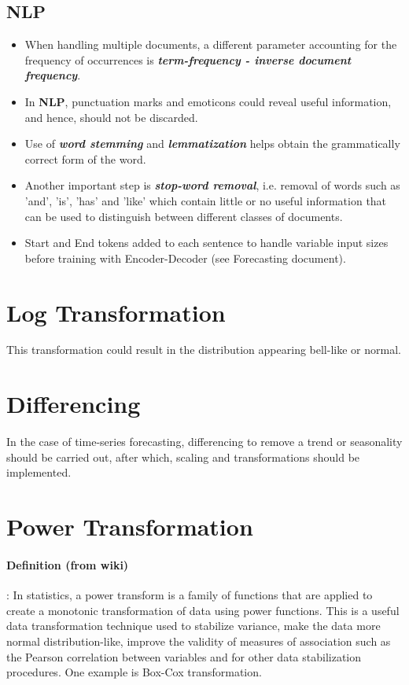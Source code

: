 \documentclass[a4paper, 12pt]{report}
\begin{document}
\subsection{NLP}
\begin{itemize}

\item When handling multiple documents, a different parameter accounting for the frequency of occurrences is \textbf{\textit{term-frequency - inverse document frequency}}.

\item In \textbf{NLP}, punctuation marks and emoticons could reveal useful information, and hence, should not be discarded.

\item Use of \textbf{\textit{word stemming}} and \textbf{\textit{lemmatization}} helps obtain the grammatically correct form of the word.

\item Another important step is \textbf{\textit{stop-word removal}}, i.e. removal of words such as 'and', 'is', 'has' and 'like' which contain little or no useful information that can be used to distinguish between different classes of documents.

\item Start and End tokens added to each sentence to handle variable input sizes before training with Encoder-Decoder (see Forecasting document).

\end{itemize}

\section{Log Transformation}
This transformation could result in the distribution appearing bell-like or normal.
\section{Differencing}
In the case of time-series forecasting, differencing to remove a trend or seasonality should be carried out, after which, scaling and transformations should be implemented.
\section{Power Transformation}

\paragraph{Definition (from wiki)}: In statistics, a power transform is a family of functions that are applied to create a monotonic transformation of data using power functions. This is a useful data transformation technique used to stabilize variance, make the data more normal distribution-like, improve the validity of measures of association such as the Pearson correlation between variables and for other data stabilization procedures. One example is Box-Cox transformation.
\end{document}
